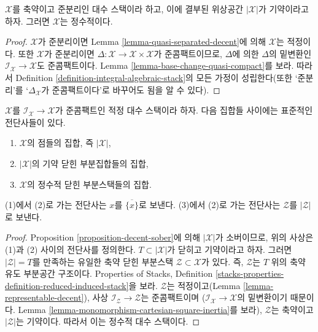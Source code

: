 \begin{lemma}
\label{lemma-totaro-case}
$\mathcal{X}$를 축약이고 준분리인 대수 스택이라 하고, 이에 결부된
위상공간 $|\mathcal{X}|$가 기약이라고 하자. 그러면 $\mathcal{X}$는
정수적이다.
\end{lemma}

\begin{proof}
$\mathcal{X}$가 준분리이면 Lemma \ref{lemma-quasi-separated-decent}에 의해
$\mathcal{X}$는 적정이다. 또한 $\mathcal{X}$가 준분리이면
$\Delta : \mathcal{X} \to \mathcal{X} \times \mathcal{X}$가 준콤팩트이므로,
$\Delta$에 의한 $\Delta$의 밑변환인
$\mathcal{I}_\mathcal{X} \to \mathcal{X}$도 준콤팩트이다. Lemma
\ref{lemma-base-change-quasi-compact}를 보라. 따라서 Definition
\ref{definition-integral-algebraic-stack}의 모든 가정이 성립한다(또한
‘준분리’를 ‘$\Delta_\mathcal{X}$가 준콤팩트이다’로 바꾸어도 됨을
알 수 있다).
\end{proof}

\begin{lemma}
\label{lemma-decent-irreducible-closed}
$\mathcal{X}$를 $\mathcal{I}_\mathcal{X} \to \mathcal{X}$가 준콤팩트인
적정 대수 스택이라 하자. 다음 집합들 사이에는 표준적인 전단사들이 있다.
\begin{enumerate}
\item $\mathcal{X}$의 점들의 집합, 즉 $|\mathcal{X}|$,
\item $|\mathcal{X}|$의 기약 닫힌 부분집합들의 집합,
\item $\mathcal{X}$의 정수적 닫힌 부분스택들의 집합.
\end{enumerate}
(1)에서 (2)로 가는 전단사는 $x$를 $\overline{\{x\}}$로 보낸다.
(3)에서 (2)로 가는 전단사는 $\mathcal{Z}$를 $|\mathcal{Z}|$로 보낸다.
\end{lemma}

\begin{proof}
Proposition \ref{proposition-decent-sober}에 의해 $|\mathcal{X}|$가
소버이므로, 위의 사상은 (1)과 (2) 사이의 전단사를 정의한다.
$T \subset |\mathcal{X}|$가 닫히고 기약이라고 하자. 그러면
$|\mathcal{Z}| = T$를 만족하는 유일한 축약 닫힌 부분스택
$\mathcal{Z} \subset \mathcal{X}$가 있다. 즉, $\mathcal{Z}$는 $T$ 위의
축약 유도 부분공간 구조이다. Properties of Stacks, Definition
\ref{stacks-properties-definition-reduced-induced-stack}을 보라.
$\mathcal{Z}$는 적정이고(Lemma \ref{lemma-representable-decent}), 사상
$\mathcal{I}_\mathcal{Z} \to \mathcal{Z}$는 준콤팩트이며
($\mathcal{I}_\mathcal{X} \to \mathcal{X}$의 밑변환이기 때문이다. Lemma
\ref{lemma-monomorphism-cartesian-square-inertia}를 보라),
$\mathcal{Z}$는 축약이고 $|\mathcal{Z}|$는 기약이다. 따라서 이는
정수적 대수 스택이다.
\end{proof}










